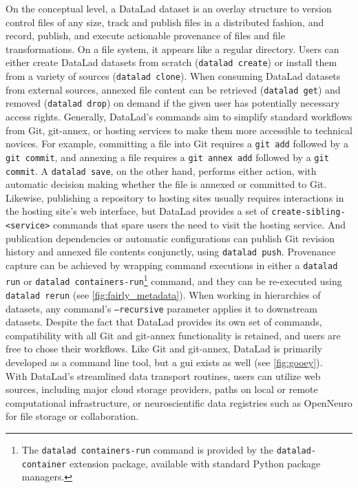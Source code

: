{On the conceptual level, a DataLad dataset is an overlay structure to version control files of any size, track and publish files in a distributed fashion, and record, publish, and execute actionable provenance of files and file
transformations.
On a file system, it appears like a regular directory.
Users can either create DataLad datasets from scratch (\texttt{datalad create}) or install them from a variety of sources (\texttt{datalad clone}).
When consuming DataLad datasets from external sources, annexed file content can be retrieved (\texttt{datalad get}) and removed (\texttt{datalad drop}) on demand if the given user has potentially necessary access rights.
Generally, DataLad's commands aim to simplify standard workflows from Git, git-annex, or hosting services to make them more accessible to technical novices.
For example, committing a file into Git requires a \texttt{git add} followed by a \texttt{git commit}, and annexing a file requires a \texttt{git annex add} followed by a \texttt{git commit}.
A \texttt{datalad save}, on the other hand, performs either action, with automatic decision making whether the file is annexed or committed to Git.
Likewise, publishing a repository to hosting sites usually requires interactions in the hosting site's web interface, but DataLad provides a set of \texttt{create-sibling-<service>} commands that spare users the need to visit the hosting service.
And publication dependencies or automatic configurations can publish Git revision history and annexed file contents conjunctly, using \texttt{datalad push}.
Provenance capture can be achieved by wrapping command executions in either a \texttt{datalad run} or \texttt{datalad containers-run}\footnote{The \texttt{datalad containers-run} command is provided by the \texttt{datalad-container} extension package, available with standard Python package managers.} command, and they can be re-executed using \texttt{datalad rerun} (see \cref{fig:fairly_metadata}).
When working in hierarchies of datasets, any command's \texttt{--recursive} parameter applies it to downstream datasets.
Despite the fact that DataLad provides its own set of commands, compatibility with all Git and git-annex functionality is retained, and users are free to chose their workflows.
Like Git and git-annex, DataLad is primarily developed as a command line tool, but a \gls{gui} exists as well (see \cref{fig:gooey}).\\
With DataLad's streamlined data transport routines, users can utilize web sources, including major cloud storage providers, paths on local or remote computational infrastructure, or neuroscientific data registries such as OpenNeuro \citep{markiewicz2021openneuro} for file storage or collaboration.
}

